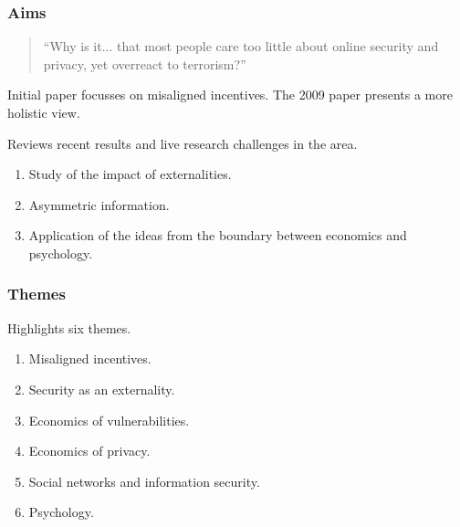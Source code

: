 \documentclass[handout, notes=hide]{beamer}
\begin{document}
\begin{frame}
\frametitle{Aims}
\setlength{\parskip}{0.5em}

\begin{quote}
``Why is it... that most people care too little about online security and privacy, yet overreact to terrorism?''
\end{quote}

Initial paper focusses on misaligned incentives. The 2009 paper presents a more holistic view.

Reviews recent results and live research challenges in the area.

\begin{enumerate}
\item Study of the impact of externalities.
\item Asymmetric information.
\item Application of the ideas from the boundary between economics and psychology.
\end{enumerate}

\end{frame}


\begin{frame}
\frametitle{Themes}

Highlights six themes.
\begin{enumerate}
\item Misaligned incentives.
\item Security as an externality.
\item Economics of vulnerabilities.
\item Economics of privacy.
\item Social networks and information security.
\item Psychology.
\end{enumerate}

\end{frame}

\end{document}
